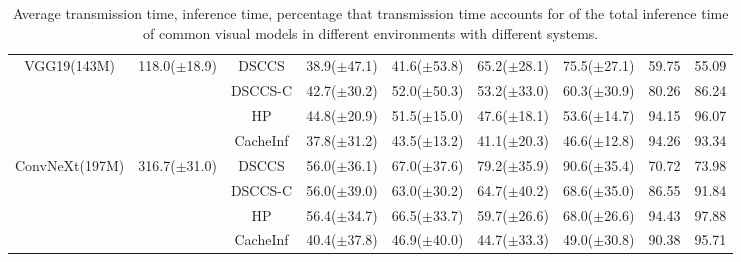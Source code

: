 \begin{table}[htb]
\begin{tabular}{ccc|c|c|c|c|c|c}
\multirow[c]{4}{*}{VGG19(143M)} & \multirow[c]{4}{*}{118.0($\pm$18.9)} & DSCCS & 38.9($\pm$47.1) & 41.6($\pm$53.8) & 65.2($\pm$28.1) & 75.5($\pm$27.1) & 59.75 & 55.09 \\
 &  & DSCCS-C & 42.7($\pm$30.2) & 52.0($\pm$50.3) & 53.2($\pm$33.0) & 60.3($\pm$30.9) & 80.26 & 86.24 \\
 &  & HP & 44.8($\pm$20.9) & 51.5($\pm$15.0) & 47.6($\pm$18.1) & 53.6($\pm$14.7) & 94.15 & 96.07 \\
 &  & CacheInf & 37.8($\pm$31.2) & 43.5($\pm$13.2) & 41.1($\pm$20.3) & 46.6($\pm$12.8) & 94.26 & 93.34 \\
\cline{1-9} \cline{2-9}
\multirow[c]{4}{*}{ConvNeXt(197M)} & \multirow[c]{4}{*}{316.7($\pm$31.0)} & DSCCS & 56.0($\pm$36.1) & 67.0($\pm$37.6) & 79.2($\pm$35.9) & 90.6($\pm$35.4) & 70.72 & 73.98 \\
 &  & DSCCS-C & 56.0($\pm$39.0) & 63.0($\pm$30.2) & 64.7($\pm$40.2) & 68.6($\pm$35.0) & 86.55 & 91.84 \\
 &  & HP & 56.4($\pm$34.7) & 66.5($\pm$33.7) & 59.7($\pm$26.6) & 68.0($\pm$26.6) & 94.43 & 97.88 \\
 &  & CacheInf & 40.4($\pm$37.8) & 46.9($\pm$40.0) & 44.7($\pm$33.3) & 49.0($\pm$30.8) & 90.38 & 95.71 \\
\cline{1-9} \cline{2-9}
\bottomrule
\end{tabular}
    \caption{Average transmission time, inference time, percentage that transmission time accounts for of the total inference time of common visual models in different environments with different systems. }
    \label{tab:torchvision_time}
\end{table}

